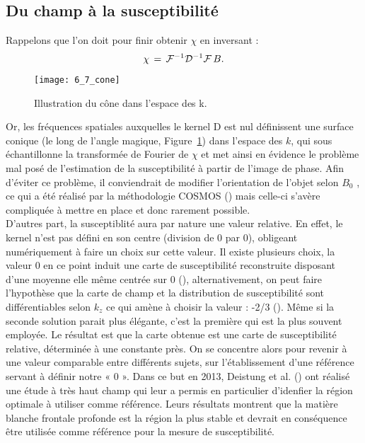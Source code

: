 {\subsection{Du champ à la susceptibilité}
\label{sec:champsusc}
Rappelons que l’on doit pour finir obtenir $\chi$ en inversant :
\begin{equation}
\chi\,=\,{\cal F}^{-1}{\cal D}^{-1}{\cal F}\,B.
\end{equation}
\begin{figure}[!t]
\centering
\texttt{[image: 6\_7\_cone]}
\caption{Illustration du cône
dans l'espace des k.}
\label{fig:6_7_cone}	
\end{figure}
Or, les fréquences spatiales auxquelles le kernel D est nul définissent une
surface conique (le long de l’angle magique, Figure~\ref{fig:6_7_cone}) dans l’espace des
$k$, qui sous échantillonne la transformée de Fourier de $\chi$ et met ainsi en
évidence le problème mal posé de l’estimation de la susceptibilité à partir
de l’image de phase. Afin d’éviter ce problème, il conviendrait de modifier
l’orientation de l’objet selon $B_0$ , ce qui a été réalisé par la méthodologie COSMOS (\cite{Liu2009b}) mais celle-ci s’avère compliquée à mettre en place et donc rarement possible.\\
D’autres part, la susceptiblité aura par nature une valeur relative. En effet, le kernel n’est pas
défini en son centre (division de 0 par 0), obligeant numériquement à faire un choix sur cette valeur.
Il existe plusieurs choix, la valeur 0 en ce point induit une carte de susceptibilité reconstruite disposant
d’une moyenne elle même centrée sur 0 (\cite{DeRochefort2010}), alternativement, on peut faire l’hypothèse que la carte
de champ et la distribution de susceptibilité sont différentiables selon $k_z$ ce qui amène à choisir la
valeur : -2/3 (\cite{Li2011}). Même si la seconde solution parait plus élégante, c’est la première qui est la plus
souvent employée. Le résultat est que la carte obtenue est une carte de susceptibilité relative,
déterminée à une constante près. On se concentre alors pour revenir à une valeur comparable entre
différents sujets, sur l’établissement d’une référence servant à définir notre « 0 ». Dans ce but en 2013,
Deistung et al. (\cite{Deistung2013}) ont réalisé une étude à très haut champ qui leur a permis en particulier d’idenfier
la région optimale à utiliser comme référence. Leurs résultats montrent que la matière blanche
frontale profonde est la région la plus stable et devrait en conséquence être utilisée comme référence
pour la mesure de susceptibilité.\\
}

